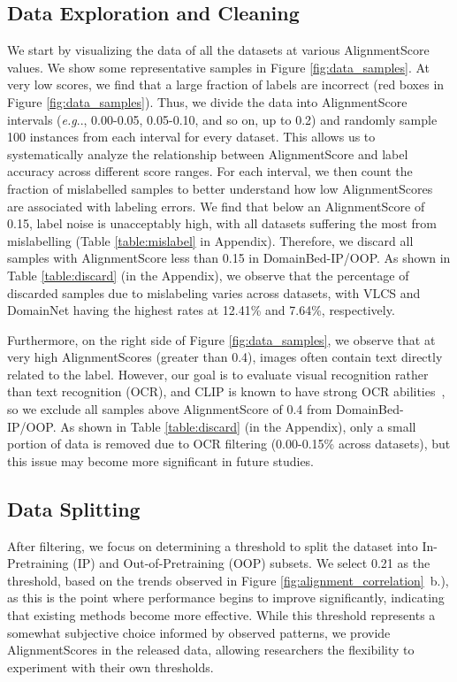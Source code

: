 \documentclass{article} %
\makeatletter
\DeclareRobustCommand\onedot{\futurelet\@let@token\@onedot}
\def\@onedot{\ifx\@let@token.\else.\null\fi\xspace}
\def\eg{\emph{e.g}\onedot} \def\Eg{\emph{E.g}\onedot}
\makeatother
\begin{document}
\subsection{Data Exploration and Cleaning } 
\label{sec:exploration_cleaning}

We start by visualizing the data of all the datasets at various AlignmentScore values. We show some representative samples in Figure \ref{fig:data_samples}. At very low scores, we find that a large fraction of labels are incorrect (red boxes in Figure \ref{fig:data_samples}). Thus, we divide the data into AlignmentScore intervals (\eg, 0.00-0.05, 0.05-0.10, and so on, up to 0.2) and randomly sample 100 instances from each interval for every dataset. This allows us to systematically analyze the relationship between AlignmentScore and label accuracy across different score ranges. For each interval, we then count the fraction of mislabelled samples to better understand how low AlignmentScores are associated with labeling errors. We find that below an AlignmentScore of 0.15, label noise is unacceptably high, with all datasets suffering the most from mislabelling (Table \ref{table:mislabel} in Appendix). Therefore, we discard all samples with AlignmentScore less than 0.15 in DomainBed-IP/OOP. As shown in Table \ref{table:discard} (in the Appendix), we observe that the percentage of discarded samples due to mislabeling varies across datasets, with VLCS and DomainNet having the highest rates at 12.41\% and 7.64\%, respectively.

Furthermore, on the right side of Figure \ref{fig:data_samples}, we observe that at very high AlignmentScores (greater than 0.4), images often contain text directly related to the label. However, our goal is to evaluate visual recognition rather than text recognition (OCR), and CLIP is known to have strong OCR abilities~\citep{Fort2021CLIPadversarialstickers}, so we exclude all samples above AlignmentScore of 0.4 from DomainBed-IP/OOP. As shown in Table \ref{table:discard} (in the Appendix), only a small portion of data is removed due to OCR filtering (0.00-0.15\% across datasets), but this issue may become more significant in future studies.
\subsection{Data Splitting}
\label{sec:data_split}

After filtering, we focus on determining a threshold to split the dataset into In-Pretraining (IP) and Out-of-Pretraining (OOP) subsets. We select 0.21 as the threshold, based on the trends observed in Figure \ref{fig:alignment_correlation}~b.), as this is the point where performance begins to improve significantly, indicating that existing methods become more effective. While this threshold represents a somewhat subjective choice informed by observed patterns, we provide AlignmentScores in the released data, allowing researchers the flexibility to experiment with their own thresholds.
\end{document}
